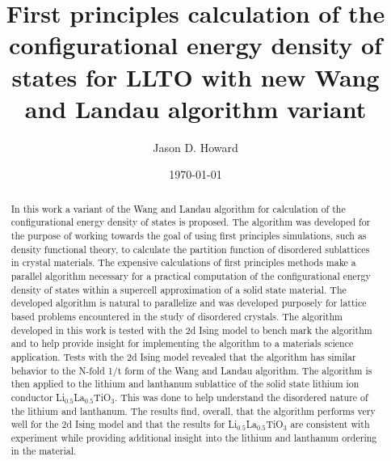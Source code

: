 \documentclass[aps,pre,reprint,superscriptaddress,showkeys]{revtex4-1}
\begin{document}
\title{First principles calculation of the configurational energy density of states for LLTO with new Wang and Landau algorithm variant }

\author{Jason D. Howard}

\date{\today}

%


\begin{abstract}
In this work  a variant of the Wang and Landau algorithm   for calculation of  the configurational energy density of states is proposed. The algorithm was developed for the purpose of working towards the goal of using first principles simulations, such as density functional theory, to calculate the partition function of disordered sublattices in crystal materials. The expensive calculations of first principles methods make a parallel algorithm necessary for a practical computation of the configurational energy density of states within a supercell approximation of a solid state material. The developed algorithm is natural to parallelize  and was developed purposely for lattice based problems encountered in the study of disordered crystals.  The algorithm developed in this work is tested with the 2d Ising model to bench mark the algorithm and to help provide insight for implementing the algorithm to a materials science application. Tests with the 2d Ising model revealed that the algorithm has similar behavior to the N-fold 1/t form of the Wang and Landau algorithm. The algorithm is then applied to the lithium and lanthanum sublattice of the solid state lithium ion conductor Li$_{0.5}$La$_{0.5}$TiO$_{3}$. This was done to help understand the disordered nature of the lithium and lanthanum. The results find, overall, that the algorithm performs very well for the 2d Ising model and that the results for Li$_{0.5}$La$_{0.5}$TiO$_{3}$ are consistent with experiment while providing additional insight into the lithium and lanthanum ordering in the material. 
\end{abstract}
\maketitle
\end{document}
